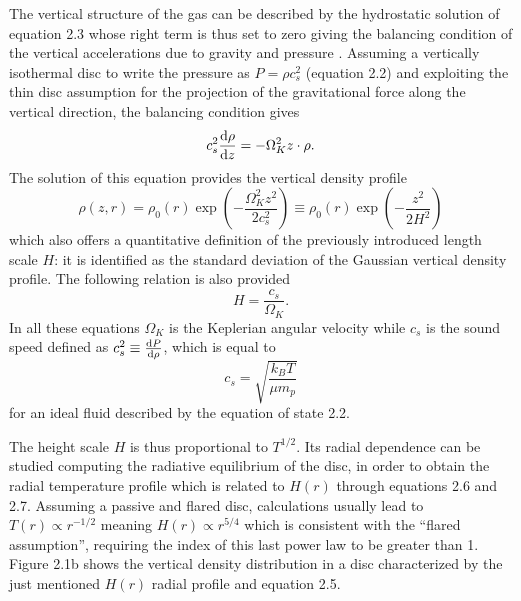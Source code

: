 \documentclass[a4paper,10pt]{report}
\begin{document}
The vertical structure of the gas can be described by the hydrostatic solution
of equation 2.3 whose right term is thus set to zero giving the balancing condition of the vertical
accelerations due to gravity and pressure \citep[pp. 38-41]{book_planet_form}. Assuming a vertically isothermal disc to write the pressure as $P=\rho c_s^2$ (equation 2.2)
and exploiting the thin 
disc assumption for the projection of the gravitational
 force along the vertical direction,
the balancing condition gives
\begin{equation}
    c_s^2\dv{\rho}{z}= -\Omega_K^2z\cdot \rho.
\end{equation}
The solution of this equation provides the vertical density profile
\begin{equation}
    \rho(z, r) = \rho_0(r)\exp(-\frac{\Omega_K^2z^2}{2c_s^2}) \equiv \rho_0(r)\exp(-\frac{z^2}{2H^2})
\end{equation}
which also offers a quantitative definition of the previously introduced length scale
$H$: it is identified as the 
standard deviation of the Gaussian vertical density profile.
The following relation is also provided
\begin{equation}
    H = \frac{c_s}{\Omega_K}.
\end{equation}
In all these equations $\Omega_K$ is the Keplerian 
angular velocity while $c_s$ is the sound speed defined as $c_s^2 \equiv \dv{P}{\rho}$, which is equal to 
\begin{equation}
    c_s = \sqrt{\frac{k_BT}{\mu m_p}}
\end{equation}
for an 
ideal fluid described by the equation of state 2.2.

The height scale $H$ is thus proportional to $T^{1/2}$. Its radial dependence
can be studied computing the radiative equilibrium of the disc, in order to obtain the 
radial temperature profile which is related to $H(r)$ through equations 2.6 and 2.7.
Assuming a passive and flared disc, calculations usually lead to $T(r) \propto r^{-1/2}$ 
meaning $H(r) \propto r^{5/4}$ which is consistent with the ``flared assumption'', requiring the index of this last
power law to be greater than 1.
Figure 2.1b shows the vertical density distribution in a disc characterized by the just mentioned $H(r)$ radial profile
and equation 2.5.
\end{document}
